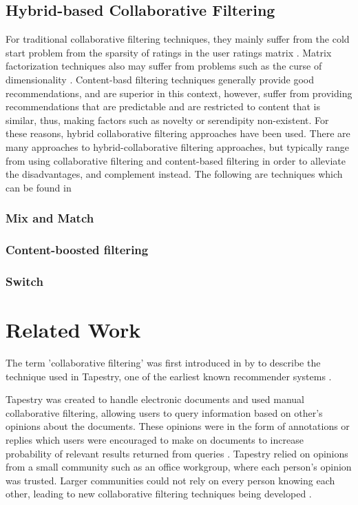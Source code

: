 \subsection{Hybrid-based Collaborative Filtering}
For traditional collaborative filtering techniques, they mainly suffer from the cold start problem from the sparsity of ratings in the user ratings matrix . Matrix factorization techniques also may suffer from problems such as the curse of dimensionality . Content-basd filtering techniques generally provide good recommendations, and are superior in this context, however, suffer from providing recommendations that are predictable and are restricted to content that is similar, thus, making factors such as novelty or serendipity non-existent. For these reasons, hybrid collaborative filtering approaches have been used. There are many approaches to hybrid-collaborative filtering approaches, but typically range from using collaborative filtering and content-based filtering in order to alleviate the disadvantages, and complement instead. The following are techniques which can be found in 
\subsubsection{Mix and Match}
\subsubsection{Content-boosted filtering}
\subsubsection{Switch}

\section{Related Work}

The term 'collaborative filtering' was first introduced in \citeyear{goldberg1992using} by \citeauthor{goldberg1992using} to describe the technique used in Tapestry, one of the earliest known recommender systems \cite{koren2009matrix,  goldberg1992using, itembased, survey}.

Tapestry \cite{goldberg1992using} was created to handle electronic documents and used manual collaborative filtering, allowing users to query information based on other's opinions about the documents. These opinions were in the form of annotations or replies which users were encouraged to make on documents to increase probability of relevant results returned from queries \cite{schafer2007collaborative}. Tapestry relied on opinions from a small community such as an office workgroup, where each person's opinion was trusted. Larger communities could not rely on every person knowing each other, leading to new collaborative filtering techniques being developed \cite{itembased}. 

